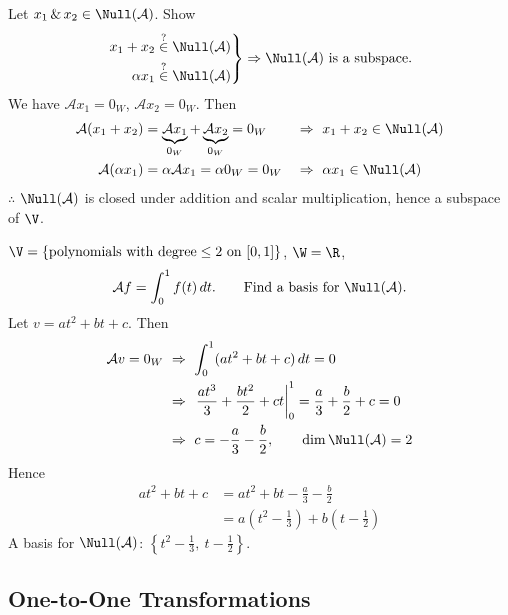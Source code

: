 Let $x_1 \,\&\, x_2\in\Null(\mathcal{A})$. Show
\[
\left.\begin{aligned}
x_1+x_2 &\overset{?}{\in}\Null(\mathcal{A})\\
\alpha x_1 &\overset{?}{\in}\Null(\mathcal{A})
\end{aligned}\right\}
\Rightarrow \Null(\mathcal{A}) \text{ is a subspace.}
\]
We have $\mathcal{A}x_1=0_W$, $\mathcal{A}x_2=0_W$. Then
\begin{align*}
\mathcal{A}(x_1+x_2) &= \underbrace{\mathcal{A}x_1}_{0_W}+\underbrace{\mathcal{A}x_2}_{0_W}=0_W &&\Rightarrow\ x_1+x_2\in\Null(\mathcal{A})\\*
\mathcal{A}(\alpha x_1) &= \alpha\mathcal{A}x_1=\alpha 0_W=0_W &&\Rightarrow\ \alpha x_1\in\Null(\mathcal{A})
\end{align*}
$\therefore$ $\Null(\mathcal{A})$ is closed under addition and scalar multiplication, hence a subspace of $\V$.

\begin{example}
$\V=\{\text{polynomials with degree}\le 2 \text{ on } [0,1]\}$, \quad $\W=\R$,
\[
\mathcal{A}f=\int_0^1 f(t)\,dt. \qquad\text{Find a basis for } \Null(\mathcal{A}).
\]
Let $v=at^2+bt+c$. Then
\begin{align*}
\mathcal{A}v=0_W \ &\Rightarrow\ \int_0^1(at^2+bt+c)\,dt=0\\
&\Rightarrow\ \left.\frac{at^3}{3}+\frac{bt^2}{2}+ct\right|_0^1=\frac a3+\frac b2+c=0\\
&\Rightarrow\ c=-\frac a3-\frac b2, \qquad \dim\Null(\mathcal{A})=2
\end{align*}
Hence
\begin{align*}
at^2+bt+c &= at^2+bt-\frac a3-\frac b2\\
&= a\left(t^2-\frac13\right)+b\left(t-\frac12\right)
\end{align*}
A basis for $\Null(\mathcal{A})$: $\left\{t^2-\frac13,\ t-\frac12\right\}$.
\end{example}

\subsection{One-to-One Transformations}\label{ss:one-to-one}

